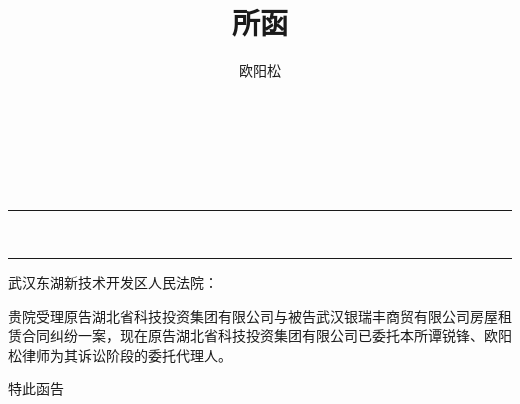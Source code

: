 \documentclass[fontset=none,zihao=-4,linespread=1.4]{ctexart}
\author{欧阳松}
\date{\zhtoday}
\title{所函}
\begin{document}
\pagestyle{fancy}
\begin{spacing}{1}
\begin{center}
\noindent {}\\
\vspace{.8ex}
\\
\vspace{5ex}
\\
\vspace{3ex}

{ \hfill {}}

\noindent\rule{\textwidth}{0.6pt}\vspace*{-\baselineskip}\vspace*{2pt}\\ %
	\rule{\textwidth}{1.6pt} %
\end{center}
\end{spacing}

\large
\noindent 武汉东湖新技术开发区人民法院： \par
\vspace{1ex}

贵院受理原告湖北省科技投资集团有限公司与被告武汉银瑞丰商贸有限公司房屋租赁合同纠纷一案，现在原告湖北省科技投资集团有限公司已委托本所谭锐锋、欧阳松律师为其诉讼阶段的委托代理人。

\vspace{3ex}
特此函告
\vspace{5ex}



\hfill {}\par
\vspace{2ex}
\hfill \makebox[10em][c]{\today}

\end{document}

